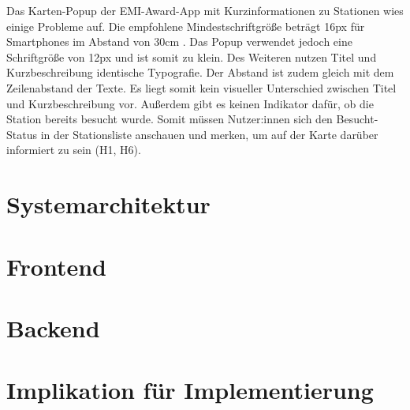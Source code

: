 Das Karten-Popup der EMI-Award-App mit Kurzinformationen zu Stationen wies
einige Probleme auf. Die empfohlene Mindestschriftgröße beträgt 16px für
Smartphones im Abstand von 30cm \cite{DBSV2022}. Das Popup verwendet jedoch eine
Schriftgröße von 12px und ist somit zu klein. Des Weiteren nutzen Titel und
Kurzbeschreibung identische Typografie. Der Abstand ist zudem gleich mit dem
Zeilenabstand der Texte. Es liegt somit kein visueller Unterschied zwischen
Titel und Kurzbeschreibung vor. Außerdem gibt es keinen Indikator dafür, ob die
Station bereits besucht wurde. Somit müssen Nutzer:innen sich den Besucht-Status
in der Stationsliste anschauen und merken, um auf der Karte darüber informiert
zu sein (H1, H6).


\section{Systemarchitektur}




\section{Frontend}




\section{Backend}




\section{Implikation für Implementierung}

